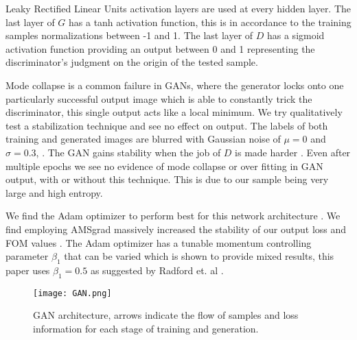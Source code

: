 \documentclass{article}
\begin{document}
        Leaky Rectified Linear Units activation layers are used at every hidden layer. The last layer of $G$ has a tanh activation function, this is in accordance to the training samples normalizations between -1 and 1. The last layer of $D$ has a sigmoid activation function providing an output between 0 and 1 representing the discriminator's judgment on the origin of the tested sample. 
        
        
        Mode collapse is a common failure in GANs, where the generator locks onto one particularly successful output image which is able to constantly trick the discriminator, this single output acts like a local minimum. We try qualitatively test a stabilization technique and see no effect on output. The labels of both training and generated images are blurred with Gaussian noise of $\mu = 0$ and $\sigma = 0.3$, \cite{salimans2016improved}. The GAN gains stability when the job of $D$ is made harder \cite{sonderby2016amortised}. Even after multiple epochs we see no evidence of mode collapse or over fitting in GAN output, with or without this technique. This is due to our sample being very large and high entropy. 
        
        
        
      
        
        We find the Adam optimizer to perform best for this network architecture \cite{kingma2014adam}. We find employing AMSgrad massively increased the stability of our output loss and FOM values \cite{reddi2018convergence}. The Adam optimizer has a tunable momentum controlling parameter $\beta_1$ that can be varied which is shown to provide mixed results, this paper uses $\beta_1 = 0.5$ as suggested by Radford et. al \cite{radford2015unsupervised}.
        
        \begin{figure}[h!]
        \centering
        \texttt{[image: GAN.png]}
        \caption{GAN architecture, arrows indicate the flow of samples and loss information for each stage of training and generation.}
        \label{GAN-diagram}
        \end{figure}
    
\end{document}
